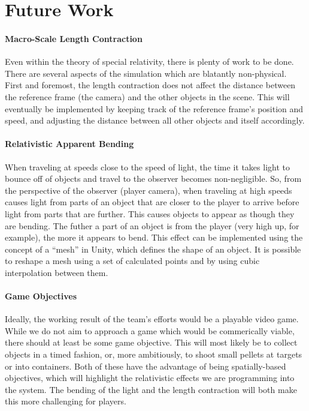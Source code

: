 \documentclass[12pt]{article}
\begin{document}
\section{Future Work}

\paragraph{Macro-Scale Length Contraction}
Even within the theory of special relativity, there is plenty of work to be done. There are several aspects of the simulation which are blatantly non-physical. First and foremost, the length contraction does not affect the distance between the reference frame (the camera) and the other objects in the scene. This will eventually be implemented by keeping track of the reference frame's position and speed, and adjusting the distance between all other objects and itself accordingly.

\paragraph{Relativistic Apparent Bending}
When traveling at speeds close to the speed of light, the time it takes light to bounce off of objects and travel to the observer becomes non-negligible. So, from the perspective of the observer (player camera), when traveling at high speeds causes light from parts of an object that are closer to the player to arrive before light from parts that are further. This causes objects to appear as though they are bending. The futher a part of an object is from the player (very high up, for example), the more it appears to bend. This effect can be implemented using the concept of a \enquote{mesh} in Unity, which defines the shape of an object. It is possible to reshape a mesh using a set of calculated points and by using cubic interpolation between them.

\paragraph{Game Objectives}
Ideally, the working result of the team's efforts would be a playable video game. While we do not aim to approach a game which would be commerically viable, there should at least be some game objective. This will most likely be to collect objects in a timed fashion, or, more ambitiously, to shoot small pellets at targets or into containers. Both of these have the advantage of being spatially-based objectives, which will highlight the relativistic effects we are programming into the system. The bending of the light and the length contraction will both make this more challenging for players.





























 
\end{document}
